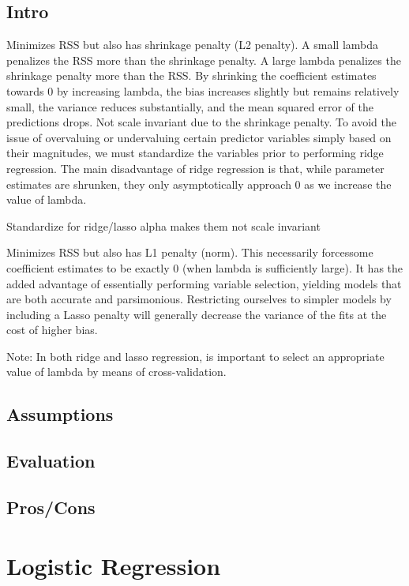 \documentclass[]{book}
\theoremstyle{definition}
\theoremstyle{definition}
\theoremstyle{definition}
\theoremstyle{remark}
\begin{document}
\subsection{Intro}\label{intro-1}

Minimizes RSS but also has shrinkage penalty (L2 penalty). A small
lambda penalizes the RSS more than the shrinkage penalty. A large lambda
penalizes the shrinkage penalty more than the RSS. By shrinking the
coefficient estimates towards 0 by increasing lambda, the bias increases
slightly but remains relatively small, the variance reduces
substantially, and the mean squared error of the predictions drops. Not
scale invariant due to the shrinkage penalty. To avoid the issue of
overvaluing or undervaluing certain predictor variables simply based on
their magnitudes, we must standardize the variables prior to performing
ridge regression. The main disadvantage of ridge regression is that,
while parameter estimates are shrunken, they only asymptotically
approach 0 as we increase the value of lambda.

Standardize for ridge/lasso alpha makes them not scale invariant

Minimizes RSS but also has L1 penalty (norm). This necessarily
forcessome coefficient estimates to be exactly 0 (when lambda is
sufficiently large). It has the added advantage of essentially
performing variable selection, yielding models that are both accurate
and parsimonious. Restricting ourselves to simpler models by including a
Lasso penalty will generally decrease the variance of the fits at the
cost of higher bias.

Note: In both ridge and lasso regression, is important to select an
appropriate value of lambda by means of cross-validation.

\subsection{Assumptions}\label{assumptions-1}

\subsection{Evaluation}\label{evaluation}

\subsection{Pros/Cons}\label{proscons-1}

\section{Logistic Regression}\label{logistic-regression}
\end{document}
